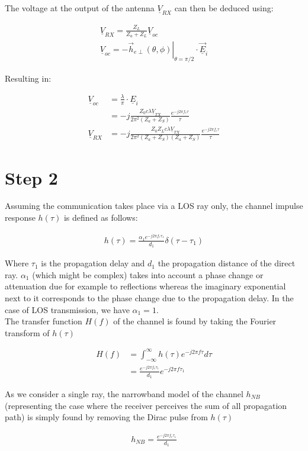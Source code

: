 \documentclass[10pt,a4paper]{ULBreport}
\begin{document}
The voltage at the output of the antenna $\underline{V}_{RX}$ can then be deduced using:

\begin{align*}
    \underline{V}_{RX} = \frac{Z_L}{Z_a + Z_L} \underline{V}_{oc}\\
    \underline{V}_{oc} = -\left . \vec{h}_{e\perp}(\theta, \phi)\right\vert_{\theta = \pi/2} \cdot \underline{\vec{E}}_i
\end{align*}

Resulting in:

\begin{align*}
    \underline{V}_{oc} &= \frac{\lambda}{\pi} \cdot \underline{E}_i\\
    &= -j\frac{Z_0 c \lambda \underline{V}_{TX}}{2\pi^2 (Z_a + Z_S)}\frac{e^{-j 2\pi f_c \tau}}{\tau}\\
    \underline{V}_{RX} &= -j\frac{Z_0 Z_L c \lambda \underline{V}_{TX}}{2\pi^2 (Z_a + Z_S) (Z_a+Z_S)}\frac{e^{-j 2\pi f_c \tau}}{\tau}
\end{align*}

\section{Step 2}

Assuming the communication takes place via a LOS ray only, the channel impulse response $h(\tau)$ is defined as follows:

\begin{align*}
    h(\tau) = \frac{\alpha_1 e^{-j2\pi f_c \tau_1}}{d_1} \delta(\tau - \tau_1)
\end{align*}

Where $\tau_1$ is the propagation delay and $d_1$ the propagation distance of the direct ray. $\alpha_1$ (which might be complex) takes into account a phase change or attenuation due for example to reflections whereas the imaginary exponential next to it corresponds to the phase change due to the propagation delay. In the case of LOS transmission, we have $\alpha_1 = 1$.\\
The transfer function $H(f)$ of the channel is found by taking the Fourier transform of $h(\tau)$

\begin{align*}
    H(f) &= \int_{-\infty}^{\infty} h(\tau) e^{-j2\pi f \tau} d\tau\\
    &= \frac{e^{-j2\pi f_c \tau_1}}{d_1}e^{-j2\pi f \tau_1}
\end{align*}

As we consider a single ray, the narrowband model of the channel $h_{NB}$ (representing the case where the receiver perceives the sum of all propagation path) is simply found by removing the Dirac pulse from $h(\tau)$

\begin{align*}
    h_{NB} = \frac{e^{-j2\pi f_c \tau_1}}{d_1}
\end{align*}













\end{document}

